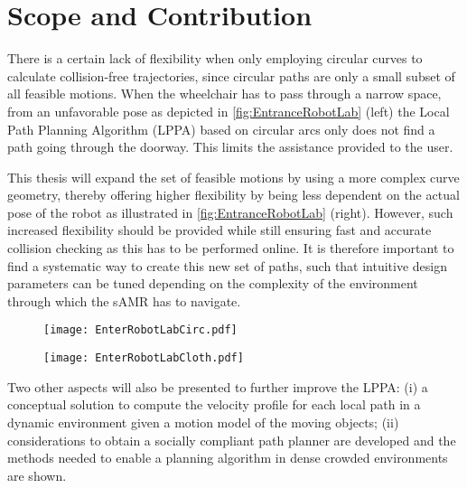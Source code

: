 \newpage
\section{Scope and Contribution} \label{sec:contribution}
There is a certain lack of flexibility when only employing circular curves to calculate collision-free trajectories, since circular paths are only a small subset of all feasible motions. When the wheelchair has to pass through a narrow space, from an unfavorable pose as depicted in \cref{fig:EntranceRobotLab} (left) the Local Path Planning Algorithm (LPPA) based on circular arcs only does not find a path going through the doorway. This limits the assistance provided to the user.

This thesis will expand the set of feasible motions by using a more complex curve geometry, thereby offering higher flexibility by being less dependent on the actual pose of the robot as illustrated in \cref{fig:EntranceRobotLab} (right). However, such increased flexibility should be provided while still ensuring fast and accurate collision checking as this has to be performed online. It is therefore important to find a systematic way to create this new set of paths, such that intuitive design parameters can be tuned depending on the complexity of the environment through which the sAMR has to navigate.

\begin{figure}[!htbp]
\centering
	\begin{minipage}[b]{.45\linewidth}
		\centering
		\texttt{[image: EnterRobotLabCirc.pdf]}
	\end{minipage}
	\hfill%
	\centering
	\begin{minipage}[b]{.45\linewidth}
		\centering
		\texttt{[image: EnterRobotLabCloth.pdf]}
	\end{minipage}
\end{figure}

Two other aspects will also be presented to further improve the LPPA: (i) a conceptual solution to compute the velocity profile for each local path in a dynamic environment given a motion model of the moving objects; (ii) considerations to obtain a socially compliant path planner are developed and the methods needed to enable a planning algorithm in dense crowded environments are shown.

